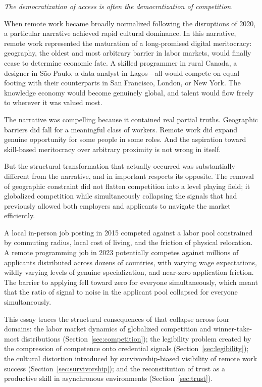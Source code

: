 \documentclass[12pt, a4paper]{article}
\theoremstyle{plain}
\theoremstyle{definition}
\theoremstyle{remark}
\begin{document}
\epigraph{\itshape
The democratization of access is often the democratization of competition.}{}

When remote work became broadly normalized following the disruptions of 2020,
a particular narrative achieved rapid cultural dominance.
In this narrative, remote work represented the maturation of a long-promised
digital meritocracy: geography, the oldest and most arbitrary barrier in labor markets,
would finally cease to determine economic fate.
A skilled programmer in rural Canada, a designer in São Paulo,
a data analyst in Lagos---all would compete on equal footing with their counterparts
in San Francisco, London, or New York.
The knowledge economy would become genuinely global, and talent would flow freely
to wherever it was valued most.

The narrative was compelling because it contained real partial truths.
Geographic barriers did fall for a meaningful class of workers.
Remote work did expand genuine opportunity for some people in some roles.
And the aspiration toward skill-based meritocracy over arbitrary proximity
is not wrong in itself.

But the structural transformation that actually occurred was substantially different
from the narrative, and in important respects its opposite.
The removal of geographic constraint did not flatten competition into a
level playing field; it globalized competition while simultaneously collapsing
the signals that had previously allowed both employers and applicants to
navigate the market efficiently.

A local in-person job posting in 2015 competed against a labor pool constrained
by commuting radius, local cost of living, and the friction of physical relocation.
A remote programming job in 2023 potentially competes against millions of applicants
distributed across dozens of countries, with varying wage expectations,
wildly varying levels of genuine specialization, and near-zero application friction.
The barrier to applying fell toward zero for everyone simultaneously,
which meant that the ratio of signal to noise in the applicant pool
collapsed for everyone simultaneously.

This essay traces the structural consequences of that collapse across four domains:
the labor market dynamics of globalized competition and winner-take-most distributions
(Section~\ref{sec:competition});
the legibility problem created by the compression of competence onto credential signals
(Section~\ref{sec:legibility});
the cultural distortion introduced by survivorship-biased visibility
of remote work success (Section~\ref{sec:survivorship});
and the reconstitution of trust as a productive skill
in asynchronous environments (Section~\ref{sec:trust}).
\end{document}
